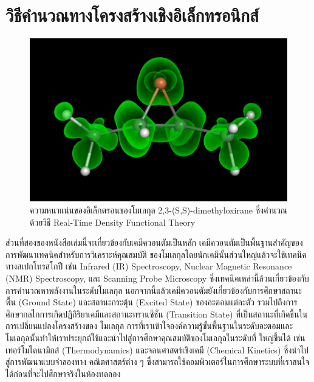 

\chapter{วิธีคำนวณทางโครงสร้างเชิงอิเล็กทรอนิกส์}
\label{ch:el_strct}

\begin{figure}[htbp]
    \centering
    \includegraphics[width=0.9\linewidth]{fig/electron_density.png}
    \caption{ความหนาแน่นของอิเล็กตรอนของโมเลกุล 2,3-(S,S)-dimethyloxirane ซึ่งคำนวณด้วยวิธี Real-Time Density
        Functional Theory}
    \label{fig:elec_density}
\end{figure}

ส่วนที่สองของหนังสือเล่มนี้จะเกี่ยวข้องกับเคมีควอนตัมเป็นหลัก เคมีควอนตัมเป็นพื้นฐานสำคัญของการพัฒนาเทคนิคสำหรับการวิเคราะห์คุณสมบัติ%
ของโมเลกุลโดยนักเคมีนั้นส่วนใหญ่แล้วจะใช้เทคนิคทางสเปกโทรสโกปี เช่น Infrared (IR) Spectroscopy, Nuclear Magnetic Resonance
(NMR) Spectroscopy, และ Scanning Probe Microscopy ซึ่งเทคนิคเหล่านี้ล้วนเกี่ยวข้องกับการคำนวณหาพลังงานในระดับโมเลกุล
นอกจากนี้แล้วเคมีควอนตัมยังเกี่ยวข้องกับการศึกษาสถานะพื้น (Ground State) และสถานะกระตุ้น (Excited State) ของอะตอมแต่ละตัว
รวมไปถึงการศึกษากลไกการเกิดปฏิกิริยาเคมีและสถานะทรานซิชั่น (Transition State) ที่เป็นสถานะที่เกิดขึ้นในการเปลี่ยนแปลงโครงสร้างของ%
โมเลกุล การที่เราเข้าใจองค์ความรู้ขั้นพื้นฐานในระดับอะตอมและโมเลกุลนั้นทำให้เราประยุกต์ใช้และนำไปสู่การศึกษาคุณสมบัติของโมเลกุลในระดับที่%
ใหญ่ขึ้นได้ เช่น เทอร์โมไดนามิกส์ (Thermodynamics) และจลนศาสตร์เชิงเคมี (Chemical Kinetics) ซึ่งนำไปสู่การพัฒนาแบบจำลองทาง%
คณิตศาสตร์ต่าง ๆ ซึ่งสามารถใช้คอมพิวเตอร์ในการศึกษาระบบที่เราสนใจได้ก่อนที่จะไปศึกษาจริงในห้องทดลอง

